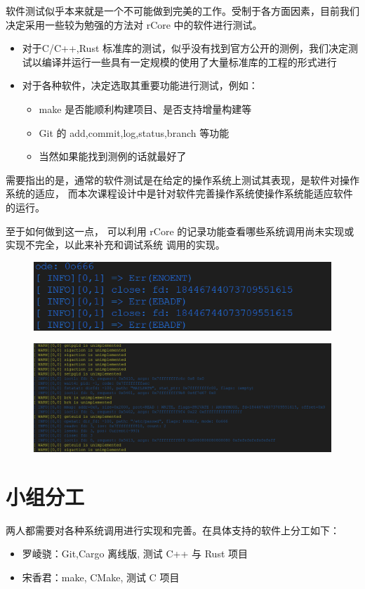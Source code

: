 \documentclass{article}
\begin{document}
    软件测试似乎本来就是一个不可能做到完美的工作。受制于各方面因素，目前我们决定采用一些较为勉强的方法对 rCore 中的软件进行测试。

    \begin{itemize}
        \item 对于C/C++,Rust 标准库的测试，似乎没有找到官方公开的测例，我们决定测试以编译并运行一些具有一定规模的使用了大量标准库的工程的形式进行
        \item 对于各种软件，决定选取其重要功能进行测试，例如：
        \begin{itemize}
            \item make 是否能顺利构建项目、是否支持增量构建等
            \item Git 的 add,commit,log,status,branch 等功能
            \item 当然如果能找到测例的话就最好了
        \end{itemize}
    \end{itemize}

    需要指出的是，通常的软件测试是在给定的操作系统上测试其表现，是软件对操作系统的适应，
    而本次课程设计中是针对软件完善操作系统使操作系统能适应软件的运行。
    
    \newpage
    至于如何做到这一点，
    可以利用 rCore 的记录功能查看哪些系统调用尚未实现或实现不完全，以此来补充和调试系统
    调用的实现。

    \begin{figure}[H]
        \centering
        \includegraphics[width=\linewidth]{assets/syscall0.png}
    \end{figure}
    \begin{figure}[H]
        \centering
        \includegraphics[width=\linewidth]{assets/syscall1.png}
    \end{figure}


    \section{小组分工}
    两人都需要对各种系统调用进行实现和完善。在具体支持的软件上分工如下：
    \begin{itemize}
        \item 罗崚骁：Git,Cargo 离线版, 测试 C++ 与 Rust 项目
        \item 宋香君：make, CMake, 测试 C 项目
    \end{itemize}
\end{document}
